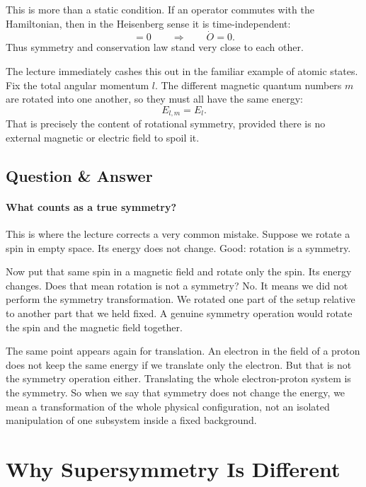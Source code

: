This is more than a static condition. If an operator commutes with the Hamiltonian, then in the Heisenberg sense it is time-independent:
\begin{equation}
[O,H]=0
\qquad \Longrightarrow \qquad
\dot O = 0.
\end{equation}
Thus symmetry and conservation law stand very close to each other.

The lecture immediately cashes this out in the familiar example of atomic states. Fix the total angular momentum \(l\). The different magnetic quantum numbers \(m\) are rotated into one another, so they must all have the same energy:
\begin{equation}
E_{l,m}=E_l.
\end{equation}
That is precisely the content of rotational symmetry, provided there is no external magnetic or electric field to spoil it.

\subsection{Question \& Answer}

\paragraph{What counts as a true symmetry?}

This is where the lecture corrects a very common mistake. Suppose we rotate a spin in empty space. Its energy does not change. Good: rotation is a symmetry.

Now put that same spin in a magnetic field and rotate only the spin. Its energy changes. Does that mean rotation is not a symmetry? No. It means we did not perform the symmetry transformation. We rotated one part of the setup relative to another part that we held fixed. A genuine symmetry operation would rotate the spin and the magnetic field together.

The same point appears again for translation. An electron in the field of a proton does not keep the same energy if we translate only the electron. But that is not the symmetry operation either. Translating the whole electron-proton system is the symmetry. So when we say that symmetry does not change the energy, we mean a transformation of the whole physical configuration, not an isolated manipulation of one subsystem inside a fixed background.

\section{Why Supersymmetry Is Different}


